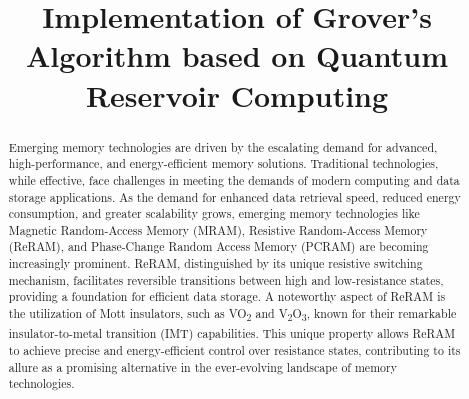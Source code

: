 \documentclass[conference]{IEEEtran}
\begin{document}
\title{ Implementation of Grover’s Algorithm based on
	Quantum Reservoir Computing  \\

}
\author{
	\and
	\and
	\and
	\and

}

\maketitle

\begin{abstract}
	Emerging memory technologies are driven by the escalating demand for advanced, high-performance, and energy-efficient memory solutions. Traditional technologies, while effective, face challenges in meeting the demands of modern computing and data storage applications. As the demand for enhanced data retrieval speed, reduced energy consumption, and greater scalability grows, emerging memory technologies like Magnetic Random-Access Memory (MRAM), Resistive Random-Access Memory (ReRAM), and Phase-Change Random Access Memory (PCRAM) are becoming increasingly prominent. ReRAM, distinguished by its unique resistive switching mechanism, facilitates reversible transitions between high and low-resistance states, providing a foundation for efficient data storage. A noteworthy aspect of ReRAM is the utilization of Mott insulators, such as VO\textsubscript{2} and V\textsubscript{2}O\textsubscript{3}, known for their remarkable insulator-to-metal transition (IMT) capabilities. This unique property allows ReRAM to achieve precise and energy-efficient control over resistance states, contributing to its allure as a promising alternative in the ever-evolving landscape of memory technologies.
\end{abstract}
\end{document}
